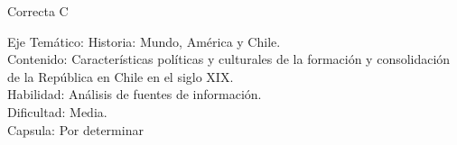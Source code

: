 \documentclass[letterpaper,11pt]{article}
\newcommand{\anchopregunta}{0.9\textwidth}
\begin{document}
\begin{enumerate}
\begin{minipage}{\anchopregunta}
\begin{key}
\end{key} 
\begin{hint}
\end{hint}
\begin{answer} Correcta C \\
\end{answer}
\begin{info} %
\begin{flushleft}
Eje Temático: Historia: Mundo, América y Chile.\\
Contenido: Características políticas y culturales de la formación y consolidación de la República en Chile en el siglo XIX.\\
Habilidad: Análisis de fuentes de información.\\
Dificultad: Media.\\
Capsula: Por determinar \\
\end{flushleft} 
\end{info}
\end{minipage}\vfill$\;$ %


\end{enumerate}
\end{document}
